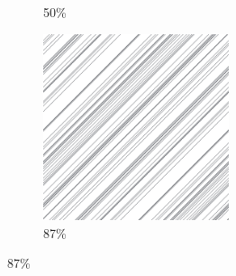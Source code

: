 \documentclass[12pt, fleqn]{report}                             %
\theoremstyle{break}                                            %
\begin{document}
\begin{figure}[ht!]
\begin{subfigure}[b]{0.4\linewidth}
          \caption{50\%}
        \end{subfigure}
        \begin{subfigure}[b]{0.4\linewidth}
          \includegraphics[width=0.6\textwidth]{Images/170/d.png}
          \caption{87\%}
        \end{subfigure}
      \end{figure}
\end{document}
